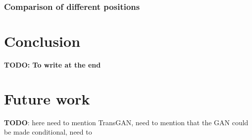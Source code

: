 \documentclass{article}
\begin{document}

\subsubsection{Comparison of different positions}

\section{Conclusion}

\textbf{TODO: To write at the end}

\section{Future work}

\textbf{TODO}: here need to mention TransGAN, need to mention that the GAN could be made conditional, need to 
    

 



\end{document}
